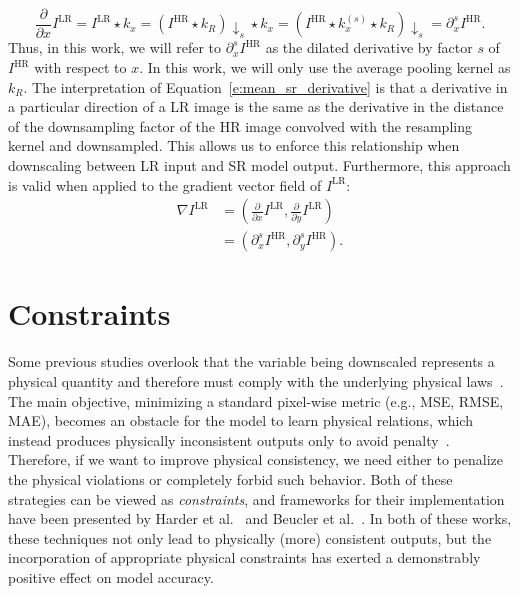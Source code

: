 \begin{equation}
\frac{\partial}{\partial x} I^\text{LR} = I^\text{LR} \star k_x = \left(I^\text{HR} \star k_R \right){\downarrow_s} \star k_x = \left(I^\text{HR} \star k^{(s)}_x \star k_R\right){\downarrow_s} = \partial_x^sI^\text{HR}.
\label{e:mean_sr_derivative}
\end{equation}
Thus, in this work, we will refer to $\partial_x^sI^\text{HR}$ as the dilated derivative by factor $s$ of $I^\text{HR}$ with respect to $x$.
In this work, we will only use the average pooling kernel as $k_R$.
The interpretation of Equation~\eqref{e:mean_sr_derivative} is that a derivative in a particular direction of a LR image is the same as the derivative in the distance of the downsampling factor of the HR image convolved with the resampling kernel and downsampled.
This allows us to enforce this relationship when downscaling between LR input and SR model output.
Furthermore, this approach is valid when applied to the gradient vector field of $I^\text{LR}$:
\begin{equation}
\begin{aligned}
    \nabla I^\text{LR} &= \left(\frac{\partial}{\partial x} I^\text{LR}, \frac{\partial}{\partial y} I^\text{LR}\right) \\
    &= \left(\partial_x^sI^\text{HR}, \partial_y^sI^\text{HR}\right).
\end{aligned}
\end{equation}

\section{Constraints}
\label{s:physical_constraints}

Some previous studies overlook that the variable being downscaled represents a physical quantity and therefore must comply with the underlying physical laws~\cite{Beucler2021}. 
The main objective, minimizing a standard pixel-wise metric (e.g., MSE, RMSE, MAE), becomes an obstacle for the model to learn physical relations, which instead produces physically inconsistent outputs only to avoid penalty~\cite{Beucler2021}. 
Therefore, if we want to improve physical consistency, we need either to penalize the physical violations or completely forbid such behavior.
Both of these strategies can be viewed as \textit{constraints}, and frameworks for their implementation have been presented by Harder et al.~\cite{Harder2023} and Beucler et al.~\cite{Beucler2021}.
In both of these works, these techniques not only lead to physically (more) consistent outputs, but the incorporation of appropriate physical constraints has exerted a demonstrably positive effect on model accuracy.

